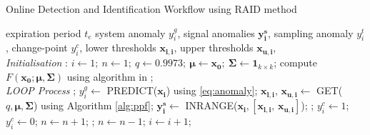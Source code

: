 \begin{algorithm}[H]
\caption{{Online Detection and Identification Workflow using RAID method}} \label{alg:detector}
 \begin{algorithmic}[1]
  \renewcommand{\algorithmicrequire}{\textbf{Input:}}
  \renewcommand{\algorithmicensure}{\textbf{Output:}}
  \REQUIRE expiration period $t_e$
  \ENSURE  system anomaly $y^g_i$, signal anomalies $\boldsymbol{y^s_i}$, sampling anomaly $y^t_i$, change-point $y^c_i$, lower thresholds $\boldsymbol{x_{l,i}}$, upper thresholds $\boldsymbol{x_{u,i}}$,
 \\ \textit{Initialisation} :
  \STATE $i \leftarrow 1;~ n \leftarrow 1;~ q \leftarrow 0.9973;~ \boldsymbol{\mu}  \leftarrow \boldsymbol{x_0};~  \boldsymbol{\Sigma} \leftarrow \mathbf{1}_{k \times k}$;
  \STATE compute $F(\boldsymbol{x_0}; \boldsymbol{\mu}, \boldsymbol{\Sigma})$ using algorithm in \cite{Genz2000};
 \\ \textit{LOOP Process}
  \LOOP
    ;
    \STATE $y^g_i \leftarrow$ PREDICT($\boldsymbol{x_i}$) using \eqref{eq:anomaly};
    \STATE $\boldsymbol{x_{l,i}}\text{, }\boldsymbol{x_{u,i}} \leftarrow$ GET($q, \boldsymbol{\mu}, \boldsymbol{\Sigma}$) using Algorithm \ref{alg:ppf};
    \STATE $\boldsymbol{y^s_i} \leftarrow$ INRANGE($\boldsymbol{x_i}, [\boldsymbol{x_{l,i}}\text{, }\boldsymbol{x_{u,i}}]$);
    \IF {\eqref{eq:anomaly} \OR \eqref{eq:condition}}
     ;
     \IF {\eqref{eq:condition}}
      \STATE $y^c_i \leftarrow 1$;
     \ELSE
      \STATE $y^c_i \leftarrow 0$;
     \ENDIF
     \STATE $n \leftarrow n + 1$;
      ;
      \STATE $n \leftarrow n - 1$;
     \ENDFOR
    \ENDIF
    \STATE $i \leftarrow i + 1$;
  \ENDLOOP
 \end{algorithmic}
\end{algorithm}
